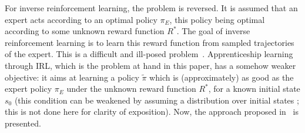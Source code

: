 \documentclass{jfpda2011}
\begin{document}
For inverse reinforcement learning, the problem is reversed. It is
assumed that an expert acts according to an optimal policy $\pi_E$,
this policy being optimal according to some unknown reward function
$R^*$. The goal of inverse reinforcement learning is to learn this
reward function from sampled trajectories of the expert. This is a
difficult and ill-posed problem~\citep{ng2000algorithms}. Apprenticeship
learning through IRL, which is the problem at hand in this paper,
has a somehow weaker objective: it aims at learning a policy
$\tilde{\pi}$ which is (approximately) as good as the expert policy
$\pi_E$ under the unknown reward function $R^*$, for a known initial
state $s_0$ (this condition can be weakened by assuming a
distribution over initial states ; this is not done here for clarity
of exposition). Now, the approach proposed in~\citep{abbeel2004apprenticeship} is
presented.
\end{document}
